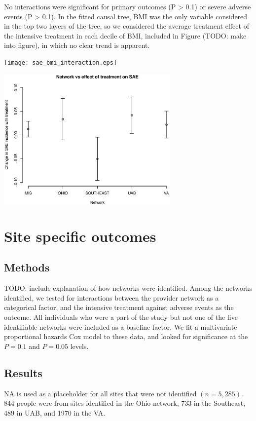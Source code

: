 \documentclass[10pt]{article}
\begin{document}
No interactions were significant for primary outcomes (P > 0.1) or severe
adverse events (P > 0.1). In the fitted causal tree, BMI was the only variable
considered in the top two layers of the tree, so we considered the average
treatment effect of the intensive treatment in each decile of BMI, included in
Figure (TODO: make into figure), in which no clear trend is apparent. 

\texttt{[image: sae\_bmi\_interaction.eps]}

\includegraphics[width=3.5in]{sae_network_interaction.eps}

\section{Site specific outcomes}
\subsection{Methods}
TODO: include explanation of how networks were identified.
Among the networks identified, we tested for interactions between the provider
network as a categorical factor, and the intensive treatment against adverse
events as the outcome. All individuals who were a part of the study but not one
of the five identifiable networks were included as a baseline factor. We fit a
multivariate proportional hazards Cox model to these data, and looked for
significance at the $P = 0.1$ and $P=0.05$ levels.

\subsection{Results}
NA is used as a placeholder for all sites that were not identified $(n = 5,285)$. $844$ people were from sites identified in the Ohio network, 733 in the Southeast, 489 in UAB, and 1970 in the VA.
\end{document}
